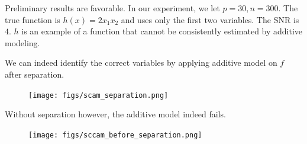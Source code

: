 \documentclass{article}
\begin{document}
Preliminary results are favorable. In our experiment, we let $p=30, n=300$. The true function is $h(x) = 2 x_1 x_2$ and uses only the first two variables. The SNR is $4$. $h$ is an example of a function that cannot be consistently estimated by additive modeling.

We can indeed identify the correct variables by applying additive model on $f$ after separation.

\begin{figure}[htp]
\label{fig:after_separation}
\centering
\texttt{[image: figs/scam\_separation.png]}
\end{figure}

Without separation however, the additive model indeed fails.


\begin{figure}[htp]
\label{fig:before_separation}
\centering
\texttt{[image: figs/sccam\_before\_separation.png]}
\end{figure}
\end{document}
